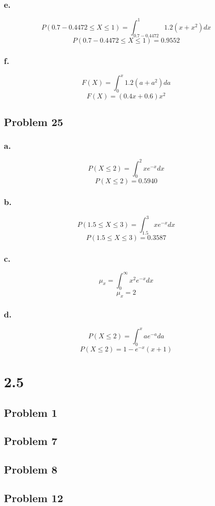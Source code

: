 \documentclass[11pt]{article}
\begin{document}
\subsubsection{e.}
\[ P(0.7 - 0.4472 \le X\le 1) = \int_{0.7 - 0.4472}^{1} 1.2(x+x^2) dx \]
\[ P(0.7 - 0.4472 \le X\le 1) = 0.9552 \]


\subsubsection{f.}
\[ F(X) = \int_{0}^{x} 1.2(a+a^2) da \]
\[ F(X) = (0.4x + 0.6) x^2  \]

\subsection{Problem 25}
\subsubsection{a.}
\[P(X\le2) = \int_{0}^{2}xe^{-x} dx \]
\[P(X\le2) = 0.5940 \]

\subsubsection{b.}
\[ P(1.5 \le X \le 3) = \int_{1.5}^{3}xe^{-x} dx \]
\[ P(1.5 \le X \le 3) = 0.3587 \]

\subsubsection{c.}
\[ \mu_x = \int_{0}^{\infty}x^2e^{-x} dx \]
\[ \mu_x = 2 \]

\subsubsection{d.}
\[P(X\le2) = \int_{0}^{x}ae^{-a} da \]
\[P(X\le2) = 1 - e^{-x}(x+1) \]

\section{2.5}
\subsection{Problem 1}

\subsection{Problem 7}

\subsection{Problem 8}

\subsection{Problem 12}
\end{document}
